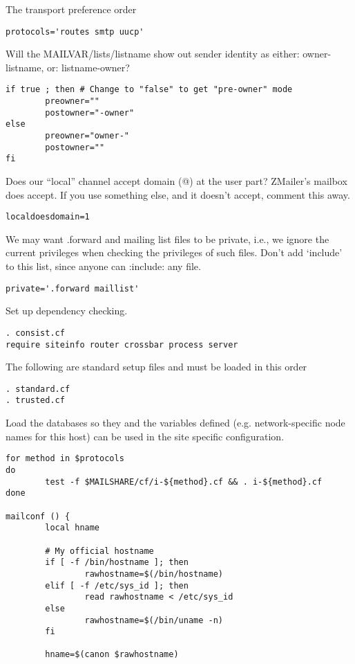 The transport preference order

\begin{verbatim}
protocols='routes smtp uucp'
\end{verbatim}


Will the  MAILVAR/lists/listname  show out sender identity as
either:  owner-listname, or:  listname-owner?

\begin{verbatim}
if true ; then # Change to "false" to get "pre-owner" mode
        preowner=""
        postowner="-owner"
else
        preowner="owner-"
        postowner=""
fi
\end{verbatim}


Does our ``local'' channel accept domain (@) at the user part?
ZMailer's mailbox does accept.  If you use something else, and
it doesn't accept, comment this away.

\begin{verbatim}
localdoesdomain=1
\end{verbatim}


We may want .forward and mailing list files to be private, i.e., we ignore
the current privileges when checking the privileges of such files.
Don't add `include' to this list, since anyone can :include: any file.

\begin{verbatim}
private='.forward maillist'
\end{verbatim}


Set up dependency checking.

\begin{verbatim}
. consist.cf
require siteinfo router crossbar process server
\end{verbatim}


The following are standard setup files and must be loaded in this order

\begin{verbatim}
. standard.cf
. trusted.cf
\end{verbatim}


Load the databases so they and the variables defined (e.g. network-specific
node names for this host) can be used in the site specific configuration.

\begin{verbatim}
for method in $protocols
do
        test -f $MAILSHARE/cf/i-${method}.cf && . i-${method}.cf
done

mailconf () {
        local hname

        # My official hostname
        if [ -f /bin/hostname ]; then
                rawhostname=$(/bin/hostname)
        elif [ -f /etc/sys_id ]; then
                read rawhostname < /etc/sys_id
        else
                rawhostname=$(/bin/uname -n)
        fi

        hname=$(canon $rawhostname)
\end{verbatim}


